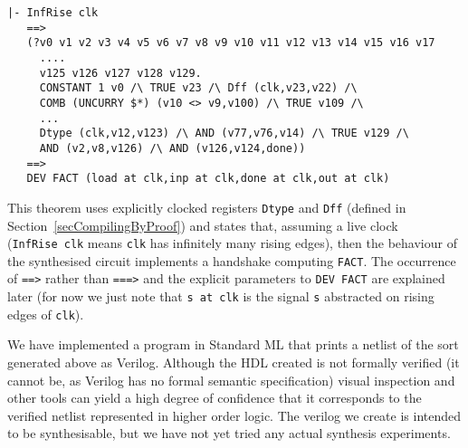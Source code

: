 \vspace*{-1mm}

{\baselineskip10pt\begin{verbatim}
|- InfRise clk
   ==>
   (?v0 v1 v2 v3 v4 v5 v6 v7 v8 v9 v10 v11 v12 v13 v14 v15 v16 v17 
     ....
     v125 v126 v127 v128 v129.
     CONSTANT 1 v0 /\ TRUE v23 /\ Dff (clk,v23,v22) /\
     COMB (UNCURRY $*) (v10 <> v9,v100) /\ TRUE v109 /\
     ...
     Dtype (clk,v12,v123) /\ AND (v77,v76,v14) /\ TRUE v129 /\
     AND (v2,v8,v126) /\ AND (v126,v124,done)) 
   ==>
   DEV FACT (load at clk,inp at clk,done at clk,out at clk) 
\end{verbatim}}

\vspace*{-2mm}

This theorem uses explicitly clocked registers \texttt{Dtype} and
\texttt{Dff} (defined in Section~\ref{secCompilingByProof}) and states
that, assuming a live clock (\texttt{InfRise~clk} means \texttt{clk}
has infinitely many rising edges), then the behaviour of the
synthesised circuit implements a handshake computing
\texttt{FACT}. The occurrence of \texttt{==>} rather than
\texttt{===>} and the explicit parameters to \texttt{DEV~FACT} are
explained later (for now we just note that \texttt{s~at~clk} is the
signal \texttt{s} abstracted on rising edges of \texttt{clk}).

We have implemented a program in Standard ML that prints a netlist of
the sort generated above as Verilog. Although the HDL created is not
formally verified (it cannot be, as Verilog has no formal semantic
specification) visual inspection and other tools can yield a high
degree of confidence that it corresponds to the verified netlist
represented in higher order logic. The verilog we create is intended
to be synthesisable, but we have not yet tried any actual synthesis
experiments.


